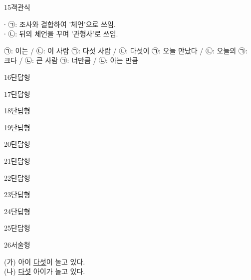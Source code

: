 \documentclass[fs9,seriesRus]{korfarm-base}
\begin{document}
\begin{kfQBlock}{15}{객관식}
\begin{kfEvidence}∙ ㉠: 조사와 결합하여 '체언'으로 쓰임.   \\\relax
    ∙ ㉡: 뒤의 체언을 꾸며 '관형사'로 쓰임.\end{kfEvidence}
\begin{kfChoices}
\kfChoice ㉠:  이는 / ㉡:  이 사람
\kfChoice ㉠:  다섯 사람 / ㉡:  다섯이
\kfChoice ㉠:  오늘 만났다 / ㉡:  오늘의
\kfChoice ㉠:  크다 / ㉡:  큰 사람
\kfChoice ㉠:  너만큼 / ㉡:  아는 만큼
\end{kfChoices}
\end{kfQBlock}
\begin{kfQBlock}{16}{단답형}
\end{kfQBlock}
\begin{kfQBlock}{17}{단답형}
\end{kfQBlock}
\begin{kfQBlock}{18}{단답형}
\end{kfQBlock}
\begin{kfQBlock}{19}{단답형}
\end{kfQBlock}
\begin{kfQBlock}{20}{단답형}
\end{kfQBlock}
\begin{kfQBlock}{21}{단답형}
\end{kfQBlock}
\begin{kfQBlock}{22}{단답형}
\end{kfQBlock}
\begin{kfQBlock}{23}{단답형}
\end{kfQBlock}
\begin{kfQBlock}{24}{단답형}
\end{kfQBlock}
\begin{kfQBlock}{25}{단답형}
\end{kfQBlock}
\begin{kfQBlock}{26}{서술형}
\begin{kfEvidence}(가) 아이 \uline{다섯}이 놀고 있다.   \\\relax
(나) \uline{다섯} 아이가 놀고 있다.\end{kfEvidence}
\end{kfQBlock}
\kfEndMC
\end{document}
